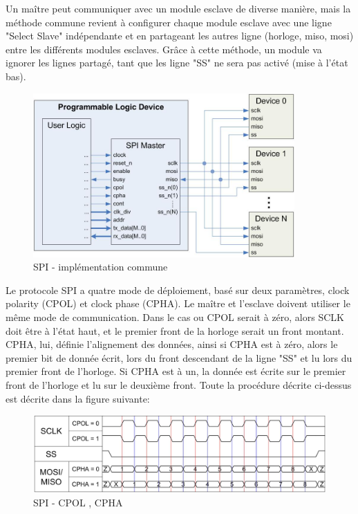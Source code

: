 \documentclass[french,a4paper,12pt]{report}
\begin{document}
			Un maître peut communiquer avec un module esclave de diverse manière, mais la méthode commune revient à configurer chaque module esclave avec une ligne "Select Slave" indépendante et en partageant les autres ligne (horloge, miso, mosi) entre les différents modules esclaves. Grâce à cette méthode, un module va ignorer les lignes partagé, tant que les ligne "SS" ne sera pas activé (mise à l'état bas).
			
	\begin{figure}[!ht]
    \center
  	\includegraphics[width=10cm]{spi_master_block.JPG}
    \caption{SPI - implémentation commune}
	\end{figure}
	
	Le protocole SPI a quatre mode de déploiement, basé sur deux paramètres, clock polarity (CPOL) et clock phase (CPHA). Le maître et l'esclave doivent utiliser le même mode de communication. 
	Dans le cas ou CPOL serait à zéro, alors SCLK doit être à l'état haut, et le premier front de la horloge serait un front montant.
	CPHA, lui, définie l'alignement des données, ainsi si CPHA est à zéro, alors le premier bit de donnée écrit, lors du front descendant de la ligne "SS" et lu lors du premier front de l'horloge. Si CPHA est à un, la donnée est écrite sur le premier front de l'horloge et lu sur le deuxième front.
	Toute la procédure décrite ci-dessus est décrite dans la figure suivante:
	
	\begin{figure}[!ht]
    \center
  	\includegraphics[width=12cm]{spi_timing_diagram.JPG}
    \caption{SPI - CPOL , CPHA}
	\end{figure}
	
\end{document}

